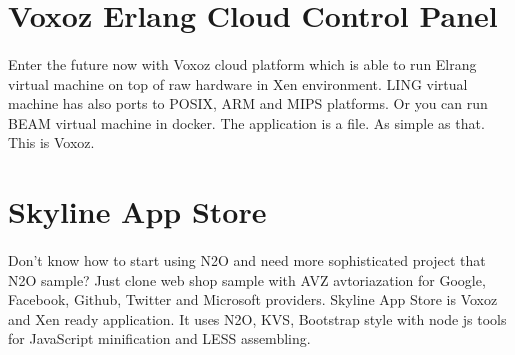 \documentclass[11pt]{article}
\begin{document}

\section*{Voxoz Erlang Cloud Control Panel}
\paragraph{}
    Enter the future now with Voxoz cloud platform which is able to run
    Elrang virtual machine on top of raw hardware in Xen environment.
    LING virtual machine has also ports to POSIX, ARM and MIPS platforms.
    Or you can run BEAM virtual machine in docker. The application is a file.
    As simple as that. This is Voxoz.




\section*{Skyline App Store}
\paragraph{}
    Don't know how to start using N2O and need more sophisticated project that N2O sample?
    Just clone  web shop sample with AVZ
    avtoriazation for Google, Facebook, Github, Twitter and Microsoft providers.
    Skyline App Store is Voxoz and Xen ready application. It uses N2O, KVS,
    Bootstrap style with node js tools for JavaScript minification and LESS assembling.

\end{document}
